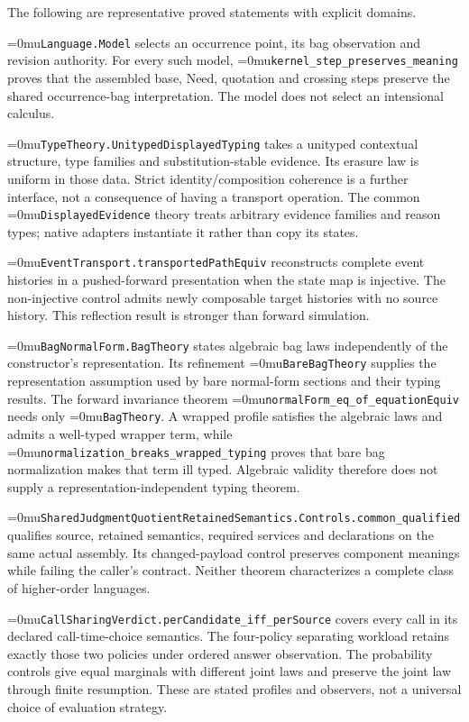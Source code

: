 \documentclass[11pt]{article}
\newcommand{\leanname}[1]{\textup{\Urlmuskip=0mu\relax\nolinkurl{#1}}}
\theoremstyle{definition}
\theoremstyle{remark}
\begin{document}
The following are representative proved statements with explicit domains.
\begin{description}[leftmargin=2.7cm,style=nextline]
\item[Operational assemblies.]
  \leanname{Language.Model} selects an occurrence point, its bag observation
  and revision authority. For every such model,
  \leanname{kernel_step_preserves_meaning} proves that the assembled base,
  Need, quotation and crossing steps preserve the shared occurrence-bag
  interpretation. The model does not select an intensional calculus.
\item[Displayed typing.]
  \leanname{TypeTheory.UnitypedDisplayedTyping} takes a unityped contextual
  structure, type families and substitution-stable evidence. Its erasure law
  is uniform in those data. Strict identity/composition coherence is a further
  interface, not a consequence of having a transport operation. The common
  \leanname{DisplayedEvidence} theory treats arbitrary evidence families and
  reason types; native adapters instantiate it rather than copy its states.
\item[History transport.]
  \leanname{EventTransport.transportedPathEquiv} reconstructs complete event
  histories in a pushed-forward presentation when the state map is injective.
  The non-injective control admits newly composable target histories with no
  source history. This reflection result is stronger than forward simulation.
\item[Algebra and representation.]
  \leanname{BagNormalForm.BagTheory} states algebraic bag laws independently
  of the constructor's representation. Its refinement
  \leanname{BareBagTheory} supplies the representation assumption used by
  bare normal-form sections and their typing results. The forward invariance
  theorem \leanname{normalForm_eq_of_equationEquiv} needs only
  \leanname{BagTheory}. A wrapped profile satisfies the algebraic
  laws and admits a well-typed wrapper term, while
  \leanname{normalization_breaks_wrapped_typing} proves that bare bag
  normalization makes that term ill typed. Algebraic validity therefore
  does not supply a representation-independent typing theorem.
\item[One joint witness.]
  \leanname{SharedJudgmentQuotientRetainedSemantics.Controls.common_qualified}
  qualifies source, retained semantics, required services and declarations on
  the same actual assembly. Its changed-payload control preserves component
  meanings while failing the caller's contract. Neither theorem characterizes
  a complete class of higher-order languages.
\item[Strategy comparisons.]
  \leanname{CallSharingVerdict.perCandidate_iff_perSource} covers every call
  in its declared call-time-choice semantics. The four-policy separating
  workload retains exactly those two policies under ordered answer observation.
  The probability controls give equal marginals with different joint laws and
  preserve the joint law through finite resumption. These are stated profiles
  and observers, not a universal choice of evaluation strategy.
\end{description}
\end{document}
